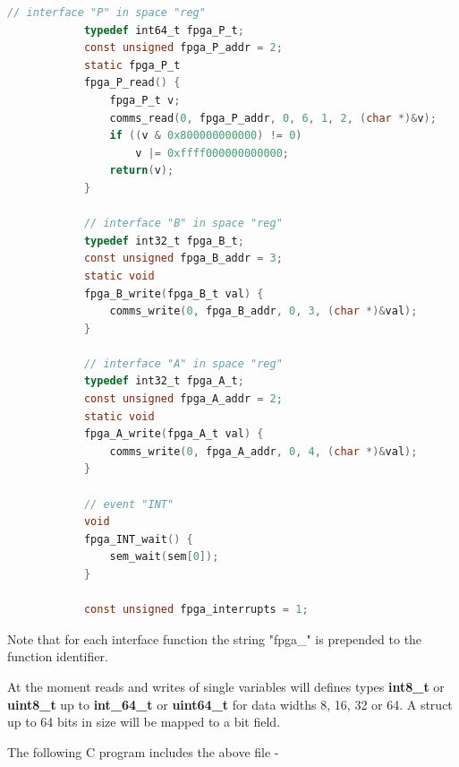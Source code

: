         \begin{lstlisting}[gobble=4, language=C]
            // interface "P" in space "reg" 
            typedef int64_t fpga_P_t;
            const unsigned fpga_P_addr = 2;
            static fpga_P_t
            fpga_P_read() {
                fpga_P_t v;
                comms_read(0, fpga_P_addr, 0, 6, 1, 2, (char *)&v);
                if ((v & 0x800000000000) != 0)
                    v |= 0xffff000000000000;
                return(v);
            }

            // interface "B" in space "reg" 
            typedef int32_t fpga_B_t;
            const unsigned fpga_B_addr = 3;
            static void
            fpga_B_write(fpga_B_t val) {
                comms_write(0, fpga_B_addr, 0, 3, (char *)&val);
            }

            // interface "A" in space "reg" 
            typedef int32_t fpga_A_t;
            const unsigned fpga_A_addr = 2;
            static void
            fpga_A_write(fpga_A_t val) {
                comms_write(0, fpga_A_addr, 0, 4, (char *)&val);
            }

            // event "INT"
            void
            fpga_INT_wait() {
                sem_wait(sem[0]);
            }

            const unsigned fpga_interrupts = 1;
        \end{lstlisting}
        Note that for each interface function the string "fpga\_" is prepended
        to the function identifier.

        At the moment reads and writes of single variables will defines types
        {\bf int8\_t} or {\bf uint8\_t} up to {\bf int\_64\_t} or {\bf uint64\_t}
        for data widths 8, 16, 32 or 64. A struct up to 64 bits in size will be
        mapped to a bit field.
    
        The following C program includes the above file -        

